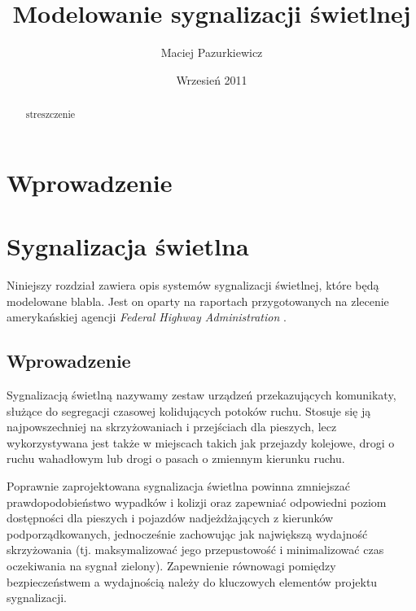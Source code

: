 \documentclass{pracamgr}
\author{Maciej Pazurkiewicz}
\title{Modelowanie sygnalizacji świetlnej}
\date{Wrzesień 2011}
\begin{document}
\maketitle

\begin{abstract}
streszczenie
\end{abstract}

\tableofcontents

\chapter*{Wprowadzenie}

\chapter{Sygnalizacja świetlna}
\label{c:sygnalizacja}

Niniejszy rozdział zawiera opis systemów sygnalizacji świetlnej, które
będą modelowane blabla. Jest on oparty na raportach przygotowanych na
zlecenie amerykańskiej agencji \emph{Federal Highway Administration}
\cite{timing} \cite{handbook}.

\section{Wprowadzenie}
\label{s:sygn-wprowadzenie}

Sygnalizacją świetlną nazywamy zestaw urządzeń przekazujących
komunikaty, służące do segregacji czasowej kolidujących potoków
ruchu. Stosuje się ją najpowszechniej na skrzyżowaniach i przejściach
dla pieszych, lecz wykorzystywana jest także w miejscach takich jak
przejazdy kolejowe, drogi o ruchu wahadłowym lub drogi o pasach o
zmiennym kierunku ruchu.

Poprawnie zaprojektowana sygnalizacja świetlna powinna zmniejszać
prawdopodobieństwo wypadków i kolizji oraz zapewniać odpowiedni poziom
dostępności dla pieszych i pojazdów nadjeżdżających z kierunków
podporządkowanych, jednocześnie zachowując jak największą wydajność
skrzyżowania (tj. maksymalizować jego przepustowość i minimalizować
czas oczekiwania na sygnał zielony).  Zapewnienie równowagi pomiędzy
bezpieczeństwem a wydajnością należy do kluczowych elementów projektu
sygnalizacji.
\end{document}
